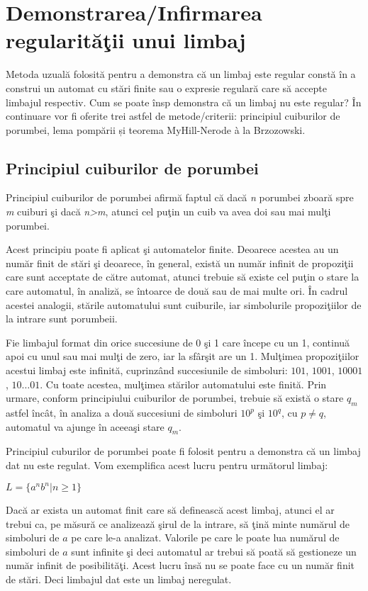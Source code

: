 \section{Demonstrarea/Infirmarea regularităţii unui limbaj}

Metoda uzuală folosită pentru a demonstra că un limbaj este regular constă în a construi un automat cu stări finite sau o expresie regulară care să accepte limbajul respectiv. Cum se poate însp demonstra că un limbaj nu este regular? În continuare vor fi oferite trei astfel de metode/criterii: principiul cuiburilor de porumbei, lema pompării și teorema MyHill-Nerode à la Brzozowski.

\subsection{Principiul cuiburilor de porumbei}

Principiul cuiburilor de porumbei afirmă faptul că dacă \textit{n} porumbei zboară spre \textit{m} cuiburi şi dacă \textit{n>m}, atunci cel puţin un cuib va avea doi sau mai mulţi porumbei.

Acest principiu poate fi aplicat şi automatelor finite. Deoarece acestea au un număr finit de stări şi deoarece, în general,  există un număr infinit de propoziţii care sunt acceptate de către automat, atunci trebuie să existe cel puţin o stare la care automatul, în analiză, se întoarce de două sau de mai multe ori. În cadrul acestei analogii, stările automatului sunt cuiburile, iar simbolurile propoziţiilor de la intrare sunt porumbeii.

Fie limbajul format din orice succesiune de 0 şi 1 care începe cu un 1, continuă apoi cu unul sau mai mulţi de zero, iar la sfârşit are un 1. Mulţimea propoziţiilor acestui limbaj este infinită, cuprinzând succesiunile de simboluri: $ 101 $, $ 1001 $, $ 10001 $, $ 10\dots01 $. Cu toate acestea, mulţimea stărilor automatului este finită. Prin urmare, conform principiului cuiburilor de porumbei, trebuie să există o stare $ q_m $ astfel încât, în analiza a două succesiuni de simboluri $ 10^{p} $ şi $ 10^{q} $, cu $ p \neq q $, automatul va ajunge în aceeaşi stare $ q_m $.

Principiul cuburilor de porumbei poate fi folosit pentru a demonstra că un limbaj dat nu este regulat. Vom exemplifica acest lucru pentru următorul limbaj:

$ L = \{ a^n b^n | n \geq 1  \} $

Dacă ar exista un automat finit care să definească acest limbaj, atunci el ar trebui ca, pe măsură ce analizează şirul de la intrare, să ţină minte numărul de simboluri de $ a $ pe care le-a analizat. Valorile pe care le poate lua numărul de simboluri de $ a $ sunt infinite şi deci automatul ar trebui să poată să gestioneze un număr infinit de posibilităţi. Acest lucru însă nu se poate face cu un număr finit de stări. Deci limbajul dat este un limbaj neregulat.

